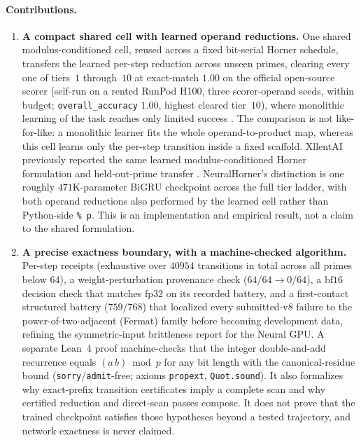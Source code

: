 \documentclass[11pt]{article}
\begin{document}
\paragraph{Contributions.}
\begin{enumerate}
\item \textbf{A compact shared cell with learned operand reductions.} One shared
modulus-conditioned cell, reused across a fixed bit-serial Horner schedule, transfers
the learned per-step reduction across unseen primes, clearing every one of tiers~$1$
through~$10$ at exact-match $1.00$ on the official open-source scorer (self-run on a rented RunPod H100,
three scorer-operand seeds, within budget; \texttt{overall\_accuracy} $1.00$, highest
cleared tier~$10$), where monolithic learning of the task reaches only limited success
\citep{lauter2024modular}. The comparison is not like-for-like: a monolithic learner
fits the whole operand-to-product map, whereas this cell learns only the per-step
transition inside a fixed scaffold. XllentAI previously reported the same learned
modulus-conditioned Horner formulation and held-out-prime transfer
\citep{xllent2026horner}. NeuralHorner's distinction is one roughly $471$K-parameter
BiGRU checkpoint across the full tier ladder, with both operand reductions also
performed by the learned cell rather than Python-side \texttt{\% p}. This is an
implementation and empirical result, not a claim to the shared formulation.
\item \textbf{A precise exactness boundary, with a machine-checked algorithm.} Per-step
receipts (exhaustive over $40954$ transitions in total across all primes below $64$), a
weight-perturbation provenance check ($64/64 \to 0/64$), a $\mathrm{bf16}$ decision
check that matches $\mathrm{fp32}$ on its recorded battery, and a first-contact structured battery
($759/768$) that localized every submitted-v8 failure to the
power-of-two-adjacent (Fermat) family before becoming development data,
refining the symmetric-input brittleness \citet{price2016neural} report for the Neural
GPU. A separate Lean~4 proof machine-checks that the integer double-and-add recurrence
equals $(a\,b)\bmod p$ for any bit length with the canonical-residue bound
(\texttt{sorry}/\texttt{admit}-free; axioms \texttt{propext}, \texttt{Quot.sound}).
It also formalizes why exact-prefix transition certificates imply a complete
scan and why certified reduction and direct-scan passes compose. It does not
prove that the trained checkpoint satisfies those hypotheses beyond a tested
trajectory, and network exactness is never claimed.

\end{enumerate}
\end{document}
